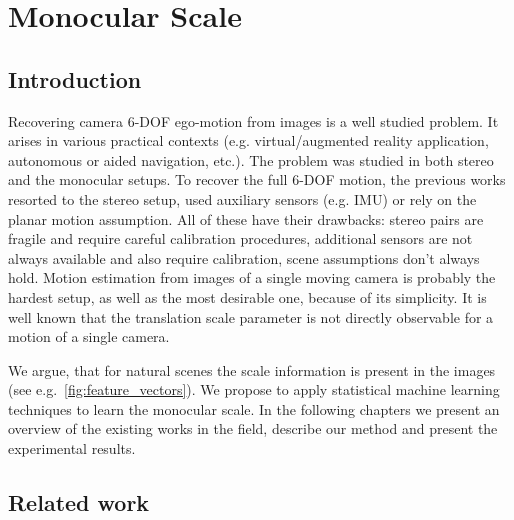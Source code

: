 \chapter{Monocular Scale}

\section{Introduction}

Recovering camera 6-DOF ego-motion from images is a well studied
problem. It arises in various practical contexts
(e.g. virtual/augmented reality application, autonomous or aided
navigation, etc.).  The problem was studied in both stereo and the
monocular setups.  To recover the full 6-DOF motion, the previous
works resorted to the stereo setup, used auxiliary sensors (e.g. IMU)
or rely on the planar motion assumption.  All of these have their
drawbacks: stereo pairs are fragile and require careful calibration
procedures, additional sensors are not always available and also
require calibration, scene assumptions don't always hold.  Motion
estimation from images of a single moving camera is probably the
hardest setup, as well as the most desirable one, because of its
simplicity.  It is well known that the translation scale parameter is
not directly observable for a motion of a single camera.

We argue, that for natural scenes the scale information is present in
the images (see e.g.~\ref{fig:feature_vectors}).  We propose to apply
statistical machine learning techniques to learn the monocular scale.
In the following chapters we present an overview of the existing works
in the field, describe our method and present the experimental
results.

\section{Related work}
